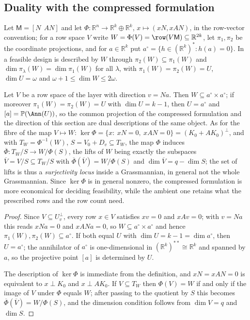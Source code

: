 \subsection{Duality with the compressed formulation}
\label{sec3:sub:duality}
Let $\mathsf{M}=[N\ \ AN]$ and let $\Phi\colon\mathbb{R}^n\to\mathbb{R}^{k}\oplus\mathbb{R}^{k}$,
$x\mapsto(xN,xAN)$, in the row-vector convention; for a row space $V$ write
$W=\Phi(V)=\row(V\mathsf{M})\subseteq\mathbb{R}^{2k}$, let $\pi_1,\pi_2$ be the coordinate projections,
and for $a\in\mathbb{R}^k$ put $a^\circ=\{h\in(\mathbb{R}^k)^*: h(a)=0\}$. In \cite{companion2} a
feasible design is described by $W$ through $\pi_2(W)\subseteq\pi_1(W)$ and
$\dim\pi_\lambda(W)=\dim\pi_1(W)$ for all $\lambda$, with $\pi_1(W)=\pi_2(W)=U$, $\dim U=\omega$ and
$\omega+1\le\dim W\le 2\omega$.

\begin{prop}
\label{sec3:prop:duality}
\label{sec3:prop:fibres}
\label{sec3:rem:noalternative}
Let $V$ be a row space of the layer with direction $v=Na$. Then $W\subseteq a^\circ\times a^\circ$; if
moreover $\pi_1(W)=\pi_2(W)=U$ with $\dim U=k-1$, then $U=a^\circ$ and
$[a]=\mathbb{P}(\Ann(U))$, so the common projection of the compressed formulation and the direction of
this section are dual descriptions of the same object. As for the fibre of the map $V\mapsto W$:
$\ker\Phi=\{x:\ xN=0,\ xAN=0\}=(K_0+AK_0)^\perp$, and with $T_W=\Phi^{-1}(W)$, $S=V_0+D_v\subseteq T_W$,
the map $\Phi$ induces $\overline{\Phi}\colon T_W/S\to W/\Phi(S)$, the lifts of $W$ being exactly the
subspaces $\overline{V}=V/S\subseteq T_W/S$ with $\overline{\Phi}(\overline{V})=W/\Phi(S)$ and
$\dim\overline{V}=q-\dim S$; the set of lifts is thus a \emph{surjectivity locus} inside a
Grassmannian, in general not the whole Grassmannian. Since $\ker\Phi$ is in general nonzero, the
compressed formulation is more economical for deciding feasibility, while the ambient one retains what
the prescribed rows and the row count need.
\end{prop}
\begin{proof}
Since $V\subseteq U_v^\perp$, every row $x\in V$ satisfies $xv=0$ and $xAv=0$; with $v=Na$ this reads
$xNa=0$ and $xANa=0$, so $W\subseteq a^\circ\times a^\circ$ and hence
$\pi_1(W),\pi_2(W)\subseteq a^\circ$. If both equal $U$ with $\dim U=k-1=\dim a^\circ$, then
$U=a^\circ$; the annihilator of $a^\circ$ is one-dimensional in $(\mathbb{R}^k)^{**}\cong\mathbb{R}^k$
and spanned by $a$, so the projective point $[a]$ is determined by $U$.

The description of $\ker\Phi$ is immediate from the definition, and $xN=xAN=0$ is equivalent to
$x\perp K_0$ and $x\perp AK_0$. If $V\subseteq T_W$ then $\Phi(V)=W$ if and only if the image of $V$
under $\Phi$ equals $W$; after passing to the quotient by $S$ this becomes
$\overline\Phi(\overline V)=W/\Phi(S)$, and the dimension condition follows from $\dim V=q$ and
$\dim S$.
\end{proof}
